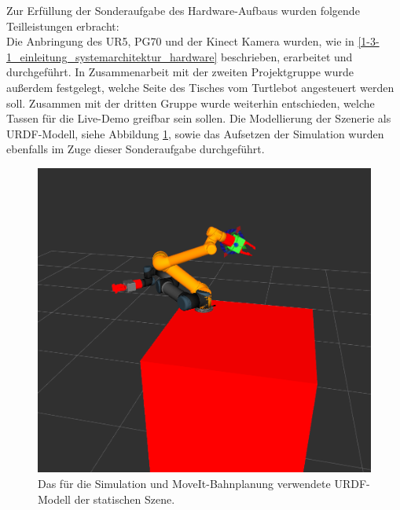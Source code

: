 Zur Erfüllung der Sonderaufgabe des Hardware-Aufbaus wurden folgende Teilleistungen erbracht:
\newline \\
Die Anbringung des UR5, PG70 und der Kinect Kamera wurden, wie in \ref{1-3-1_einleitung_systemarchitektur_hardware} beschrieben, erarbeitet und durchgeführt. In Zusammenarbeit mit der zweiten Projektgruppe wurde außerdem festgelegt, welche Seite des Tisches vom Turtlebot angesteuert werden soll. Zusammen mit der dritten Gruppe wurde weiterhin entschieden, welche Tassen für die Live-Demo greifbar sein sollen. Die Modellierung der Szenerie als URDF-Modell, siehe Abbildung \ref{urdfModell}, sowie das Aufsetzen der Simulation wurden ebenfalls im Zuge dieser Sonderaufgabe durchgeführt.
\begin{figure}
	\centering
	\includegraphics{images/Modell.png}
	\caption{Das für die Simulation und MoveIt-Bahnplanung verwendete URDF-Modell der statischen Szene.}
	\label{urdfModell}
\end{figure}
